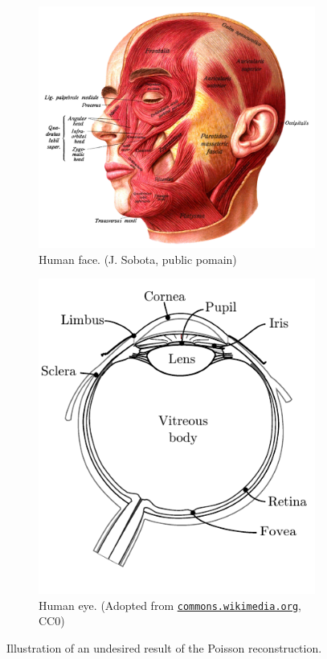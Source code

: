 \begin{figure}[ht]
	\centering 
	\begin{subfigure}[b]{0.55\textwidth}
		\centering \includegraphics[width=\linewidth]{img/analy-face.png} \caption{Human face. (J. Sobota, public pomain)} \label{i:analy-face}
	\end{subfigure}
	\begin{subfigure}[b]{0.44\textwidth}
		\centering \includegraphics[width=\linewidth]{img/analy-eye.pdf}
		\caption{Human eye. (Adopted from \href{https://commons.wikimedia.org/wiki/File:Schematic_diagram_of_the_human_eye_en.svg}{\tt commons.wikimedia.org}, CC0)}\label{i:analy-eye}
	\end{subfigure}
	\caption{Illustration of an undesired result of the Poisson reconstruction.}\label{i:analy-anatomy}
\end{figure}

